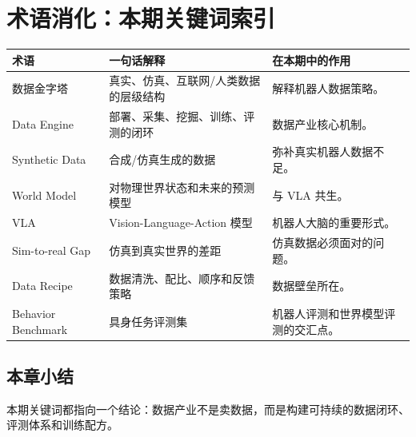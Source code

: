 \section{术语消化：本期关键词索引}

\begin{longtable}{p{}p{}p{}}
\toprule
术语 & 一句话解释 & 在本期中的作用 \\
\midrule
数据金字塔 & 真实、仿真、互联网/人类数据的层级结构 & 解释机器人数据策略。 \\
Data Engine & 部署、采集、挖掘、训练、评测的闭环 & 数据产业核心机制。 \\
Synthetic Data & 合成/仿真生成的数据 & 弥补真实机器人数据不足。 \\
World Model & 对物理世界状态和未来的预测模型 & 与 VLA 共生。 \\
VLA & Vision-Language-Action 模型 & 机器人大脑的重要形式。 \\
Sim-to-real Gap & 仿真到真实世界的差距 & 仿真数据必须面对的问题。 \\
Data Recipe & 数据清洗、配比、顺序和反馈策略 & 数据壁垒所在。 \\
Behavior Benchmark & 具身任务评测集 & 机器人评测和世界模型评测的交汇点。 \\
\bottomrule
\end{longtable}

\subsection{本章小结}

本期关键词都指向一个结论：数据产业不是卖数据，而是构建可持续的数据闭环、评测体系和训练配方。

